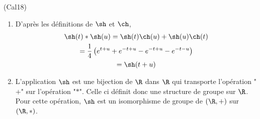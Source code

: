 \begin{tiny}(Cal18)\end{tiny}
\begin{enumerate}
 \item D'après les définitions de $\sh$ et $\ch$,
\begin{multline*}
 \sh(t)*\sh(u)=\sh(t)\ch(u)+\sh(u)\ch(t)\\
=\frac{1}{4}\left(e^{t+u}+e^{-t+u}-e^{-t+u}-e^{-t-u} \right)\\
=\sh(t+u) 
\end{multline*}

\item L'application $\sh$ est une bijection de $\R$ dans $\R$ qui transporte l'opération "$+$" sur l'opération "$*$". Celle ci définit donc une structure de groupe sur $\R$. Pour cette opération, $\sh$ est un isomorphisme de groupe de $(\R,+)$ sur $(\R,*)$.
\end{enumerate}
 
